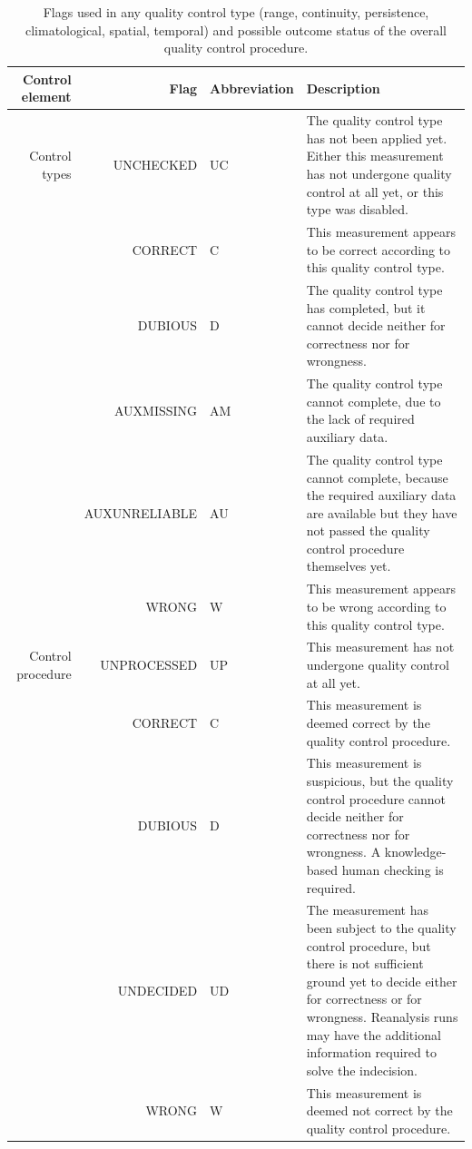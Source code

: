 \documentclass[authoryear,preprint,review,12pt]{elsarticle}
\providecommand{\DIFdelend}{} %
\begin{document}
\DIFdelend \begin{table}[]
    \begin{scriptsize}
    \centering
    \begin{tabular}{r r l p{7cm}}
    \hline
    Control element & Flag & Abbreviation & Description \\
    \hline
	Control types & UNCHECKED     & UC & The quality control type has not been applied yet. Either this measurement has not undergone quality control at all yet, or this type was disabled.\\
	& CORRECT       & C  & This measurement appears to be correct according to this quality control type. \\
	& DUBIOUS       & D  & The quality control type has completed, but it cannot decide neither for correctness nor for wrongness. \\
	& AUXMISSING    & AM & The quality control type cannot complete, due to the lack of required auxiliary data. \\
	& AUXUNRELIABLE & AU & The quality control type cannot complete, because the required auxiliary data are available but they have not passed the quality control procedure themselves yet. \\
	& WRONG         & W  & This measurement appears to be wrong according to this quality control type. \\

    \hline

	Control procedure & UNPROCESSED & UP & This measurement has not undergone quality control at all yet.\\
	& CORRECT     & C  & This measurement is deemed correct by the quality control procedure.\\
	& DUBIOUS     & D  & This measurement is suspicious, but the quality control procedure cannot decide neither for correctness nor for wrongness. A knowledge-based human checking is required. \\
	& UNDECIDED   & UD & The measurement has been subject to the quality control procedure, but there is not sufficient ground yet to decide either for correctness or for wrongness. Reanalysis runs may have the additional information required to solve the indecision.\\
	& WRONG       & W  & This measurement is deemed not correct by the quality control procedure.\\
    \hline    
    \end{tabular}
    \caption{Flags used in any quality control type (range, continuity, persistence, climatological, spatial, temporal) and possible outcome status of the overall quality control procedure.}
    \label{tab:flagsSummary}
    \end{scriptsize}
\end{table}
\end{document}
